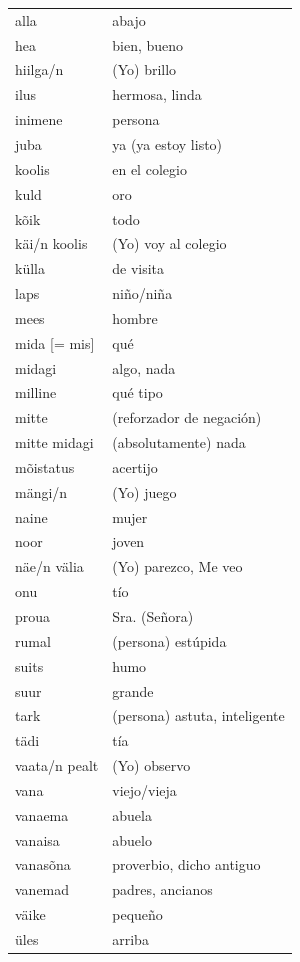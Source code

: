 \begin{tabular}{ l l }
alla			&	abajo \\
hea				&	bien, bueno \\
hiilga/n		&	(Yo) brillo \\
ilus			&	hermosa, linda \\
inimene			&	persona \\
juba			&	ya (\eg ya estoy listo) \\
koolis			&	en el colegio  \\
kuld			&	oro \\
kõik			&	todo \\
käi/n koolis	&	(Yo) voy al colegio \\
külla			&	de visita \\
laps			&	niño/niña \\
mees			&	hombre \\
mida [= mis]	&	qué \\
midagi			&	algo, nada \\
milline			&	qué tipo \\
mitte			&	(reforzador de negación) \\
mitte midagi	&	(absolutamente) nada \\
mõistatus		&	acertijo  \\
mängi/n			&	(Yo) juego \\
naine			&	mujer \\
noor			&	joven \\
näe/n välia		&	(Yo) parezco, Me veo \\
onu				&	tío \\
proua			&	Sra. (Señora) \\
rumal			&	(persona) estúpida  \\
suits			&	humo \\
suur			&	grande \\
tark			&	(persona) astuta, inteligente  \\
tädi			&	tía \\
vaata/n pealt	&	(Yo) observo \\
vana			&	viejo/vieja \\
vanaema			&	abuela \\
vanaisa			&	abuelo \\
vanasõna		&	proverbio, dicho antiguo \\
vanemad			&	padres, ancianos \\
väike			&	pequeño \\
üles			&	arriba
\end{tabular}
\bigskip

